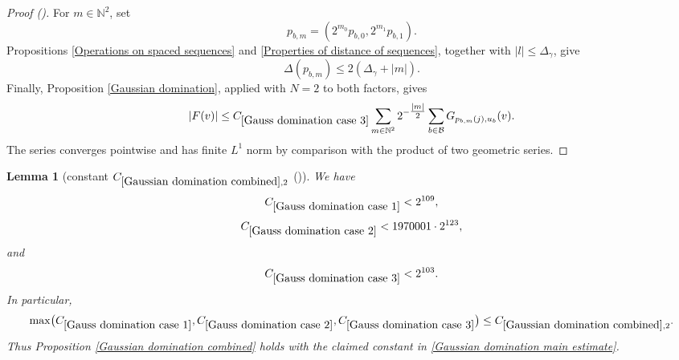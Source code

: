 \documentclass[12pt,reqno]{amsart}
\newcommand{\auto}{{({\tiny\faCar})}}
\theoremstyle{plain}
\newtheorem{lemma}[theorem]{Lemma}
\numberwithin{equation}{section}
\theoremstyle{remark}
\newcommand{\using}[1]{}
\newcommand{\N}{{\mathbb N}}
\begin{document}
\begin{proof}[Proof \auto]
For $m\in\N^2$, set
\[
p_{b,m}=(2^{m_0}p_{b,0},2^{m_1}p_{b,1}).
\]
Propositions \ref{Operations on spaced sequences} and
\ref{Properties of distance of sequences}, together with
$|l|\le\Delta_\gamma$, give
\[
\Delta(p_{b,m})
\le
2(\Delta_\gamma+|m|).
\]
Finally, Proposition \ref{Gaussian domination}, applied with $N=2$ to both factors, gives
\[
|F(v)|
\le
C_{\ref{Gauss domination case 3}}
\sum_{m\in\N^2}2^{-\tfrac{|m|}{2}}
\sum_{b\in\mathcal B}
G_{p_{b,m}(j),u_b}(v).
\]
The series converges pointwise and has finite $L^1$ norm by comparison with the product of two geometric series.

\medskip
\end{proof}

\begin{lemma}[constant $C_{\ref{Gaussian domination combined},2}$ \auto]\label{Gauss domination constant}\using{standard bump properties}\using{constant four scale Gaussian kernel}\using{constant mean four scale Gaussian kernel}\using{four scale Gaussian kernel}\using{mean four scale Gaussian kernel}\using{constant H kernel estimate Gaussian domination}\using{constant H kernel derivative estimate Gaussian domination}\using{H kernel estimate Gaussian domination}\using{H kernel derivative estimate Gaussian domination}\using{two bump estimate}\using{bump triangle}\using{Gauss domination case 1}\using{Gauss domination case 2}\using{Gauss domination case 3}
We have
\begin{equation}\label{auto:Gaussian-domination-case-constant-bounds}
C_{\ref{Gauss domination case 1}}<2^{109},
\end{equation}
\begin{equation}\label{auto:Gaussian-domination-case-two-constant-bound}
C_{\ref{Gauss domination case 2}}<1970001\cdot2^{123},
\end{equation}
and
\begin{equation}\label{auto:Gaussian-domination-case-three-constant-bound}
C_{\ref{Gauss domination case 3}}<2^{103}.
\end{equation}
In particular,
\begin{equation}\label{auto:Gaussian-domination-common-constant-bound}
\max\bigl(C_{\ref{Gauss domination case 1}},C_{\ref{Gauss domination case 2}},C_{\ref{Gauss domination case 3}}\bigr)
\le C_{\ref{Gaussian domination combined},2}.
\end{equation}
Thus Proposition \ref{Gaussian domination combined} holds with the claimed constant in \eqref{Gaussian domination main estimate}.
\end{lemma}
\end{document}
